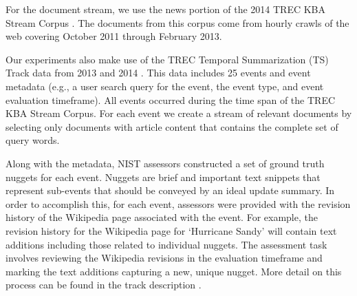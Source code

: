 For the document stream, we use the news portion of the
 2014 TREC KBA Stream Corpus \cite{frank2012building}.
The documents from this corpus come from hourly crawls of the web covering 
 October 2011 through February 2013. 


Our experiments also make use of the TREC Temporal Summarization (TS) Track
 data from 2013 and 2014 \cite{aslam2013trec}. 
This data includes 25 events and event metadata (e.g., a user
search query for the event, the event type, and event evaluation timeframe).  
All events occurred during the time span of the TREC KBA Stream Corpus.
For each event we create a stream of relevant documents by 
selecting only documents with article content that contains the complete set 
of query words. 

Along with the metadata, NIST assessors constructed a set of ground truth nuggets for each event. 
Nuggets are brief and important text snippets that represent sub-events that should be conveyed
by an ideal update summary. %
In order
to accomplish this, for each event, assessors were provided with the
revision history of the Wikipedia page associated with the event.  
For example, 
the revision history for the Wikipedia page for `Hurricane Sandy' will 
contain text additions including those related to individual nuggets.  The assessment
task involves reviewing the Wikipedia revisions in the evaluation timeframe 
and marking the text additions capturing a new, unique nugget.  More detail
on this process can be found in the track description \cite{aslam2013trec}.


